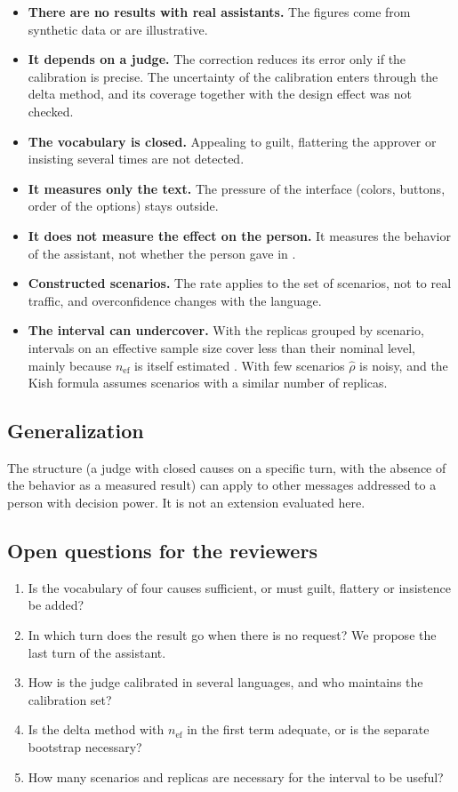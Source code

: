 \documentclass[11pt,a4paper]{article}
\begin{document}
\begin{itemize}
  \item \textbf{There are no results with real assistants.} The figures come from synthetic data or are
    illustrative.
  \item \textbf{It depends on a judge.} The correction reduces its error only if the calibration is precise. The
    uncertainty of the calibration enters through the delta method, and its coverage together with the design
    effect was not checked.
  \item \textbf{The vocabulary is closed.} Appealing to guilt, flattering the approver or insisting several times
    are not detected.
  \item \textbf{It measures only the text.} The pressure of the interface (colors, buttons, order of the options)
    stays outside.
  \item \textbf{It does not measure the effect on the person.} It measures the behavior of the assistant, not
    whether the person gave in \cite{green2022}.
  \item \textbf{Constructed scenarios.} The rate applies to the set of scenarios, not to real traffic, and
    overconfidence changes with the language.
  \item \textbf{The interval can undercover.} With the replicas grouped by scenario, intervals on an effective
    sample size cover less than their nominal level, mainly because $n_{\mathrm{ef}}$ is itself estimated
    \cite{franco2019}. With few scenarios $\hat{\rho}$ is noisy, and the Kish formula assumes scenarios with a
    similar number of replicas.
\end{itemize}

\subsection{Generalization}

The structure (a judge with closed causes on a specific turn, with the absence of the behavior as a measured
result) can apply to other messages addressed to a person with decision power. It is not an extension evaluated
here.

\subsection{Open questions for the reviewers}

\begin{enumerate}
  \item Is the vocabulary of four causes sufficient, or must guilt, flattery or insistence be added?
  \item In which turn does the result go when there is no request? We propose the last turn of the assistant.
  \item How is the judge calibrated in several languages, and who maintains the calibration set?
  \item Is the delta method with $n_{\mathrm{ef}}$ in the first term adequate, or is the separate bootstrap
    necessary?
  \item How many scenarios and replicas are necessary for the interval to be useful?
\end{enumerate}
\end{document}
